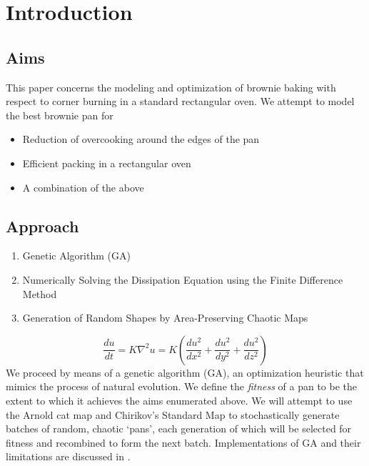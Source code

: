 \documentclass[12pt]{reedmcm}
\begin{document}
\section{Introduction}
\subsection{Aims}
This paper concerns the modeling and optimization of brownie baking with respect to corner burning in a standard rectangular oven. We attempt to model the best brownie pan for
\begin{itemize}
\item Reduction of overcooking around the edges of the pan
\item Efficient packing in a rectangular oven
\item A combination of the above 
\end{itemize}

\subsection{Approach}
\begin{enumerate}
  \item Genetic Algorithm (GA)
  \item Numerically Solving the Dissipation Equation using the Finite Difference Method
  \item Generation of Random Shapes by Area-Preserving Chaotic Maps
\end{enumerate}
\begin{equation*}
  \frac{du}{dt} = K \nabla^2 u = K (\frac{du^2}{dx^2} + \frac{du^2}{dy^2} + \frac{du^2}{dz^2})
\end{equation*}
We proceed by means of a genetic algorithm (GA), an optimization heuristic that mimics the process of natural evolution.
We define the \emph{fitness} of a pan to be the extent to which it achieves the aims enumerated above.  We will attempt to use the Arnold cat map and Chirikov's Standard Map to stochastically generate batches of random, chaotic `pans', each generation of which will be selected for fitness and recombined to form the next batch. 
Implementations of GA and their limitations are discussed in \citet{mitchell}.
\end{document}
